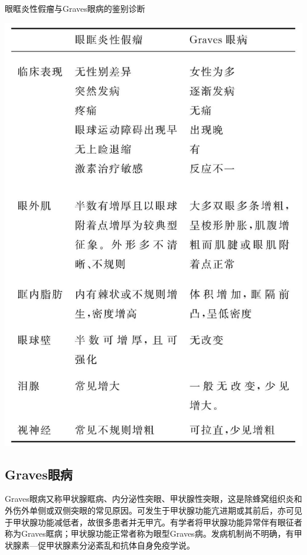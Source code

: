 \begin{table}[htbp]
\centering
\caption{眼眶炎性假瘤与Graves眼病的鉴别诊断}
\label{tab3-1}
\includegraphics[width=\textwidth,height=\textheight,keepaspectratio]{./images/Image00099.jpg}
\end{table}

\subsection{Graves眼病}

Graves眼病又称甲状腺眶病、内分泌性突眼、甲状腺性突眼，这是除蜂窝组织炎和外伤外单侧或双侧突眼的常见原因。可发生于甲状腺功能亢进期或其前后，亦可见于甲状腺功能减低者，故很多患者并无甲亢。有学者将甲状腺功能异常伴有眼征者称为Graves眶病；甲状腺功能正常者称为眼型Graves病。发病机制尚不明确，有甲状腺素---促甲状腺素分泌紊乱和抗体自身免疫学说。


